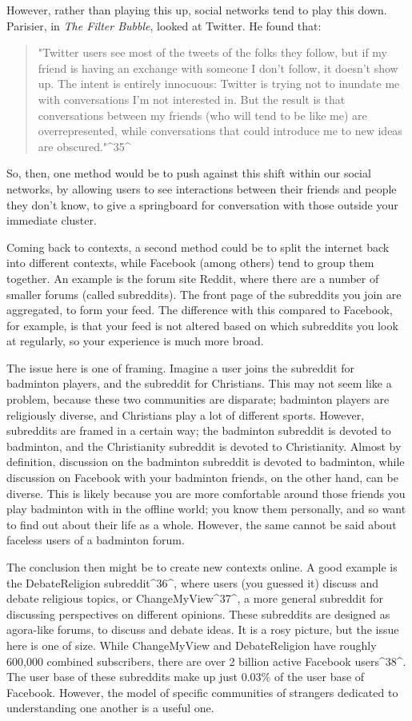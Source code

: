 \documentclass[]{article}
\begin{document}
However, rather than playing this up, social networks tend to play this
down. Parisier, in \emph{The Filter Bubble}, looked at Twitter. He found
that:

\begin{quote}
"Twitter users see most of the tweets of the folks they follow, but if
my friend is having an exchange with someone I don't follow, it doesn't
show up. The intent is entirely innocuous: Twitter is trying not to
inundate me with conversations I'm not interested in. But the result is
that conversations between my friends (who will tend to be like me) are
overrepresented, while conversations that could introduce me to new
ideas are obscured."\^{}35\^{}
\end{quote}

So, then, one method would be to push against this shift within our
social networks, by allowing users to see interactions between their
friends and people they don't know, to give a springboard for
conversation with those outside your immediate cluster.

Coming back to contexts, a second method could be to split the internet
back into different contexts, while Facebook (among others) tend to
group them together. An example is the forum site Reddit, where there
are a number of smaller forums (called subreddits). The front page of
the subreddits you join are aggregated, to form your feed. The
difference with this compared to Facebook, for example, is that your
feed is not altered based on which subreddits you look at regularly, so
your experience is much more broad.

The issue here is one of framing. Imagine a user joins the subreddit for
badminton players, and the subreddit for Christians. This may not seem
like a problem, because these two communities are disparate; badminton
players are religiously diverse, and Christians play a lot of different
sports. However, subreddits are framed in a certain way; the badminton
subreddit is devoted to badminton, and the Christianity subreddit is
devoted to Christianity. Almost by definition, discussion on the
badminton subreddit is devoted to badminton, while discussion on
Facebook with your badminton friends, on the other hand, can be diverse.
This is likely because you are more comfortable around those friends you
play badminton with in the offline world; you know them personally, and
so want to find out about their life as a whole. However, the same
cannot be said about faceless users of a badminton forum.

The conclusion then might be to create new contexts online. A good
example is the DebateReligion subreddit\^{}36\^{}, where users (you
guessed it) discuss and debate religious topics, or
ChangeMyView\^{}37\^{}, a more general subreddit for discussing
perspectives on different opinions. These subreddits are designed as
agora-like forums, to discuss and debate ideas. It is a rosy picture,
but the issue here is one of size. While ChangeMyView and DebateReligion
have roughly 600,000 combined subscribers, there are over 2 billion
active Facebook users\^{}38\^{}. The user base of these subreddits make
up just 0.03\% of the user base of Facebook. However, the model of
specific communities of strangers dedicated to understanding one another
is a useful one.
\end{document}
